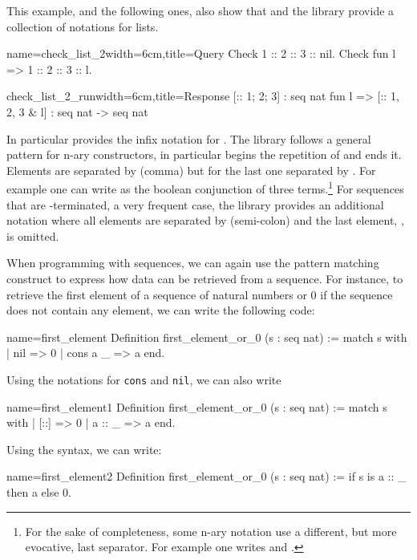 This example, and the following ones, also show
that \Coq{} and the \mcbMC{} library provide
a collection of notations for lists.

\begin{coq}{name=check_list_2}{width=6cm,title=Query}
Check 1 :: 2 :: 3 :: nil.
Check fun l => 1 :: 2 :: 3 :: l.
$~$
\end{coq}
\begin{coqout}{check_list_2_run}{width=6cm,title=Response}
[:: 1; 2; 3] : seq nat
fun l => [:: 1, 2, 3 & l]
  : seq nat -> seq nat
\end{coqout}

In particular \Coq{} provides the infix notation \C{::} for
.  The \mcbMC{} library follows a general pattern for
n-ary constructors, in particular \C{[::} begins the repetition
of \C{::} and \C{]} ends it.  Elements are separated by \C{,} (comma)
but for the last one separated by \C{&}.
For example one
can write as  the boolean conjunction
of three terms.\footnote{For the sake of completeness, some n-ary notation use a
different, but more evocative, last separator.  For example one writes
\C{[|| b1, b2 | b3]} and \C{[==> b1, b2 => b3]}.}
For sequences that are -terminated, a very frequent case,
the \mcbMC{} library provides an additional notation where all elements are
separated by \C{;} (semi-colon) and the last element, ,
is omitted.

When programming with sequences, we can again use the  pattern matching
construct to express how data can be retrieved from a sequence.  For
instance, to retrieve the first element of a sequence of natural numbers
or 0 if the sequence does not contain any element, we can write the
following code:

\begin{coq}{name=first_element}{}
Definition first_element_or_0 (s : seq nat) :=
  match s with
  | nil => 0
  | cons a _ => a
  end.
\end{coq}
Using the notations for {\tt cons} and {\tt nil}, we can also write

\begin{coq}{name=first_element1}{}
Definition first_element_or_0 (s : seq nat) :=
  match s with
  | [::] => 0
  | a :: _ => a
  end.
\end{coq}
Using the  syntax, we can write:

\begin{coq}{name=first_element2}{}
Definition first_element_or_0 (s : seq nat) :=
  if s is a :: _ then a else 0.
\end{coq}
